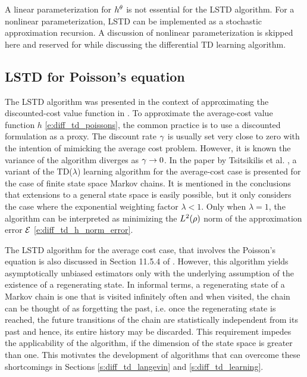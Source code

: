 A linear parameterization for $h^\theta$ is not essential for the LSTD algorithm. For a nonlinear parameterization,  LSTD can be implemented as a stochastic approximation recursion. A discussion of nonlinear parameterization is skipped here and reserved for  while discussing the differential TD learning algorithm. 

\subsection{LSTD for Poisson's equation}
\label{s:lstd_avg_cost}
The LSTD algorithm was presented in the context of approximating the discounted-cost value function in . To approximate the average-cost value function $h$ \eqref{e:diff_td_poissons}, the common practice is to use a discounted formulation as a proxy. The discount rate $\gamma$ is usually set very close to zero with the intention of mimicking the average cost problem. However, it is known the variance of the algorithm diverges as $\gamma \to 0$.  In the paper by Tsitsikilis et al. \cite{tsivan99b}, a variant of the TD($\lambda$) learning algorithm for the average-cost case is presented for the case of finite state space Markov chains. It is mentioned in the conclusions that extensions to a general state space is easily possible, but it only considers the case where the exponential weighting factor $\lambda <1$. Only when $\lambda =1$, the algorithm can be interpreted as minimizing the $L^2(\rho)$ norm of the approximation error $\mathcal{E}$ \eqref{e:diff_td_h_norm_error}. 

The LSTD algorithm for the average cost case, that involves the Poisson's equation is also discussed in Section 11.5.4 of \cite{ctcn}. However, this algorithm yields asymptotically unbiased estimators only with the underlying assumption of the existence of a regenerating state. In informal terms, a regenerating state of a Markov chain is one that is visited infinitely often and when visited, the chain can be thought of as forgetting the past, i.e. once the regenerating state is reached, the future transitions of the chain are statistically independent from its past and hence, its entire history may be discarded. This requirement impedes the applicability of the algorithm, if the dimension of the state space is greater than one. This motivates the development of algorithms that can overcome these shortcomings in Sections \ref{s:diff_td_langevin} and \ref{s:diff_td_learning}.  

